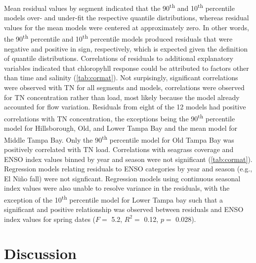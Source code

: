 \documentclass{svjour3}\usepackage[]{graphicx}\usepackage[]{color}
\newcommand{\nine}{90\textsuperscript{th} percentile }
\newcommand{\ten}{10\textsuperscript{th} percentile }
\begin{document}
Mean residual values by segment indicated that the 90\textsuperscript{th} and \ten models over- and under-fit the respective quantile distributions, whereas residual values for the mean models were centered at approximately zero.  In other words, the \nine and \ten models produced residuals that were negative and positive in sign, respectively, which is expected given the definition of quantile distributions.  Correlations of residuals to additional explanatory variables indicated that chloropyhll response could be attributed to factors other than time and salinity (\cref{tab:cormat}). Not surpisingly, significant correlations were observed with \ac{TN} for all segments and models, correlations were observed for \ac{TN} concentration rather than load, most likely because the model already accounted for flow variation.  Residuals from eight of the 12 models had positive correlations with \ac{TN} concentration, the exceptions being the \nine model for Hillsborough, Old, and Lower Tampa Bay and the mean model for Middle Tampa Bay.  Only the \nine model for Old Tampa Bay was positively correlated with \ac{TN} load.  Correlations with seagrass coverage and \ac{ENSO} index values binned by year and season were not significant (\cref{tab:cormat}).  Regression models relating residuals to \ac{ENSO} categories by year and season (e.g., El Ni\~{n}o fall) were not signficant.  Regression models using continuous seasonal index values were also unable to resolve variance in the residuals, with the exception of the \ten model for Lower Tampa bay such that a significant and positive relationship was observed between residuals and \ac{ENSO} index values for spring dates ($F=$ 5.2, $R^2 =$ 0.12, $p=$ 0.028).  

\section{Discussion}
\end{document}
